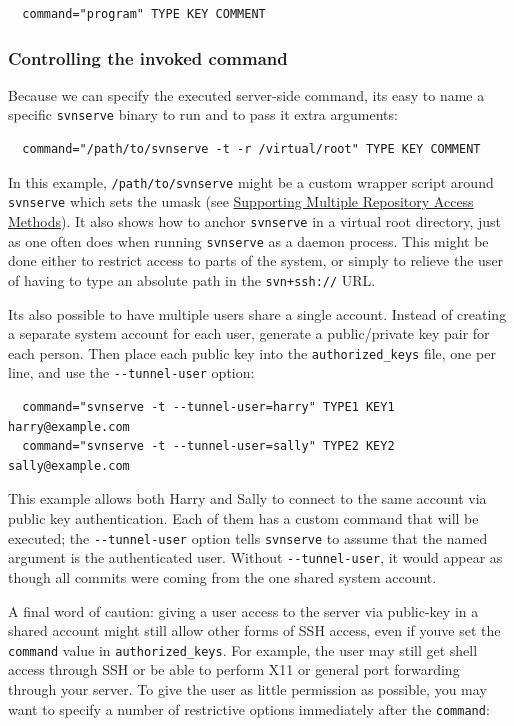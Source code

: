 \begin{verbatim}
  command="program" TYPE KEY COMMENT
\end{verbatim}

\subsubsection{Controlling the invoked
command}\label{svn.serverconfig.svnserve.sshtricks.fixedcmd}

Because we can specify the executed server-side command,
it\textquotesingle s easy to name a specific \texttt{svnserve} binary to
run and to pass it extra arguments:

\begin{verbatim}
  command="/path/to/svnserve -t -r /virtual/root" TYPE KEY COMMENT
\end{verbatim}

In this example, \texttt{/path/to/svnserve} might be a custom wrapper
script around \texttt{svnserve} which sets the umask (see
\hyperref[svn.serverconfig.multimethod]{Supporting Multiple Repository
Access Methods}). It also shows how to anchor \texttt{svnserve} in a
virtual root directory, just as one often does when running
\texttt{svnserve} as a daemon process. This might be done either to
restrict access to parts of the system, or simply to relieve the user of
having to type an absolute path in the \texttt{svn+ssh://} URL.

It\textquotesingle s also possible to have multiple users share a single
account. Instead of creating a separate system account for each user,
generate a public/private key pair for each person. Then place each
public key into the \texttt{authorized\_keys} file, one per line, and
use the \texttt{-\/-tunnel-user} option:

\begin{verbatim}
  command="svnserve -t --tunnel-user=harry" TYPE1 KEY1 harry@example.com
  command="svnserve -t --tunnel-user=sally" TYPE2 KEY2 sally@example.com
\end{verbatim}

This example allows both Harry and Sally to connect to the same account
via public key authentication. Each of them has a custom command that
will be executed; the \texttt{-\/-tunnel-user} option tells
\texttt{svnserve} to assume that the named argument is the authenticated
user. Without \texttt{-\/-tunnel-user}, it would appear as though all
commits were coming from the one shared system account.

A final word of caution: giving a user access to the server via
public-key in a shared account might still allow other forms of SSH
access, even if you\textquotesingle ve set the \texttt{command} value in
\texttt{authorized\_keys}. For example, the user may still get shell
access through SSH or be able to perform X11 or general port forwarding
through your server. To give the user as little permission as possible,
you may want to specify a number of restrictive options immediately
after the \texttt{command}:

